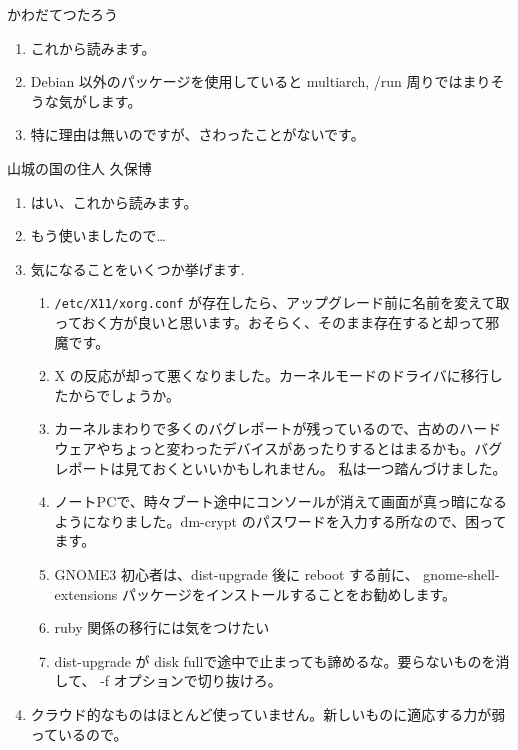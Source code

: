 \documentclass[mingoth,a4paper]{jsarticle}
\begin{document}
\begin{prework}{ かわだてつたろう }
  \begin{enumerate}
  \item %
    これから読みます。
    \setcounter{enumi}{2}
  \item %
    Debian 以外のパッケージを使用していると multiarch, /run 周りではまりそうな気がします。
  \item %
    特に理由は無いのですが、さわったことがないです。
  \end{enumerate}
\end{prework}

\begin{prework}{ 山城の国の住人 久保博 }
  \begin{enumerate}
  \item %
    はい、これから読みます。
  \item %
    もう使いましたので…
  \item %
    気になることをいくつか挙げます.
    \def\theenumii{\alph{enumii}}
    \def\labelenumii{\theenumii.~}
    \begin{enumerate}
    \item %
      \texttt{/etc/X11/xorg.conf} が存在したら、アップグレード前に名前を変えて取っておく方が良いと思います。おそらく、そのまま存在すると却って邪魔です。
    \item %
      X の反応が却って悪くなりました。カーネルモードのドライバに移行したからでしょうか。
    \item %
      カーネルまわりで多くのバグレポートが残っているので、古めのハードウェアやちょっと変わったデバイスがあったりするとはまるかも。バグレポートは見ておくといいかもしれません。 私は一つ踏んづけました。
    \item %
      ノートPCで、時々ブート途中にコンソールが消えて画面が真っ暗になるようになりました。dm-crypt のパスワードを入力する所なので、困ってます。
    \item %
      GNOME3 初心者は、dist-upgrade 後に reboot する前に、 gnome-shell-extensions パッケージをインストールすることをお勧めします。
    \item %
      ruby 関係の移行には気をつけたい
    \item %
      dist-upgrade が disk fullで途中で止まっても諦めるな。要らないものを消して、 -f オプションで切り抜けろ。
    \end{enumerate}
  \item %
    クラウド的なものはほとんど使っていません。新しいものに適応する力が弱っているので。
  \end{enumerate}
\end{prework}
\end{document}
